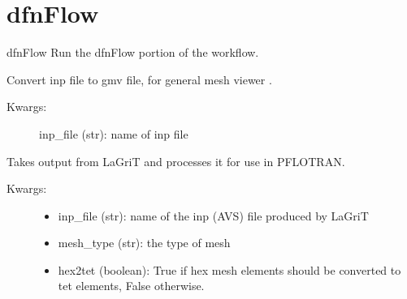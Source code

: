 \documentclass[letterpaper,10pt,english]{sphinxmanual}
\begin{document}
\section{dfnFlow}
\label{pydfnworks:module-pydfnworks.flow}\label{pydfnworks:dfnflow}

\begin{fulllineitems}
\label{pydfnworks:pydfnworks.flow.dfn_flow}
dfnFlow
Run the dfnFlow portion of the workflow.

\end{fulllineitems}


\begin{fulllineitems}
\label{pydfnworks:pydfnworks.flow.inp2gmv}
Convert inp file to gmv file, for general mesh viewer .
\begin{description}
\item[{Kwargs:}] \leavevmode
inp\_file (str): name of inp file

\end{description}

\end{fulllineitems}


\begin{fulllineitems}
\label{pydfnworks:pydfnworks.flow.lagrit2pflotran}
Takes output from LaGriT and processes it for use in PFLOTRAN.
\begin{description}
\item[{Kwargs:}] \leavevmode\begin{itemize}
\item {} 
inp\_file (str): name of the inp (AVS) file produced by LaGriT

\item {} 
mesh\_type (str): the type of mesh

\item {} 
hex2tet (boolean): True if hex mesh elements should be converted to tet elements, False otherwise.

\end{itemize}

\end{description}

\end{fulllineitems}
\end{document}
